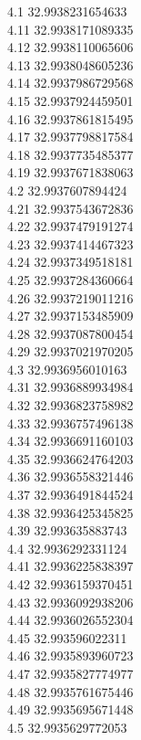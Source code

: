 {4.1	32.9938231654633\\
4.11	32.9938171089335\\
4.12	32.9938110065606\\
4.13	32.9938048605236\\
4.14	32.9937986729568\\
4.15	32.9937924459501\\
4.16	32.9937861815495\\
4.17	32.9937798817584\\
4.18	32.9937735485377\\
4.19	32.9937671838063\\
4.2	32.9937607894424\\
4.21	32.9937543672836\\
4.22	32.9937479191274\\
4.23	32.9937414467323\\
4.24	32.9937349518181\\
4.25	32.9937284360664\\
4.26	32.9937219011216\\
4.27	32.9937153485909\\
4.28	32.9937087800454\\
4.29	32.9937021970205\\
4.3	32.9936956010163\\
4.31	32.9936889934984\\
4.32	32.9936823758982\\
4.33	32.9936757496138\\
4.34	32.9936691160103\\
4.35	32.9936624764203\\
4.36	32.9936558321446\\
4.37	32.9936491844524\\
4.38	32.9936425345825\\
4.39	32.993635883743\\
4.4	32.9936292331124\\
4.41	32.9936225838397\\
4.42	32.9936159370451\\
4.43	32.9936092938206\\
4.44	32.9936026552304\\
4.45	32.993596022311\\
4.46	32.9935893960723\\
4.47	32.9935827774977\\
4.48	32.9935761675446\\
4.49	32.9935695671448\\
4.5	32.9935629772053\\
}
